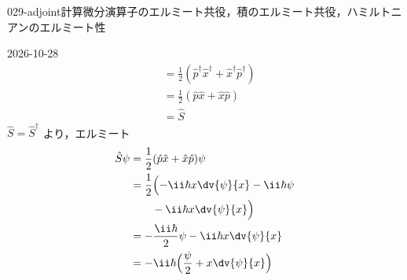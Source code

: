 \documentclass[uplatex,dvipdfmx,a4paper,11pt]{jsarticle}
\begin{document}
\begin{mondai}{029-adjoint}{計算}{微分演算子のエルミート共役，積のエルミート共役，ハミルトニアンのエルミート性}
\begin{kotaeutsushi}{2026-10-28}
\begin{align*}
&=\frac{1}{2}(\hat{p}^{\dagger}\hat{x}^{\dagger}+\hat{x}^{\dagger}\hat{p}^{\dagger})\\
&=\frac{1}{2}(\hat{p}\hat{x}+\hat{x}\hat{p})\\
&=\hat{S}
\end{align*}
$\hat{S}=\hat{S}^{\dagger}$ より，エルミート
\begin{align*}
\hat{S}\psi&=\frac{1}{2}(\hat{p}\hat{x}+\hat{x}\hat{p})\psi\\
&=\frac{1}{2}\Bigl(-\ii\hbar x\dv{\psi}{x}-\ii\hbar\psi\\
&\qquad-\ii\hbar x\dv{\psi}{x}\Bigr)\\
&=-\frac{\ii\hbar}{2}\psi-\ii\hbar x\dv{\psi}{x}\\
&=-\ii\hbar\Bigl(\frac{\psi}{2}+x\dv{\psi}{x}\Bigr)
\end{align*}
\end{kotaeutsushi}
\end{mondai}
\end{document}
